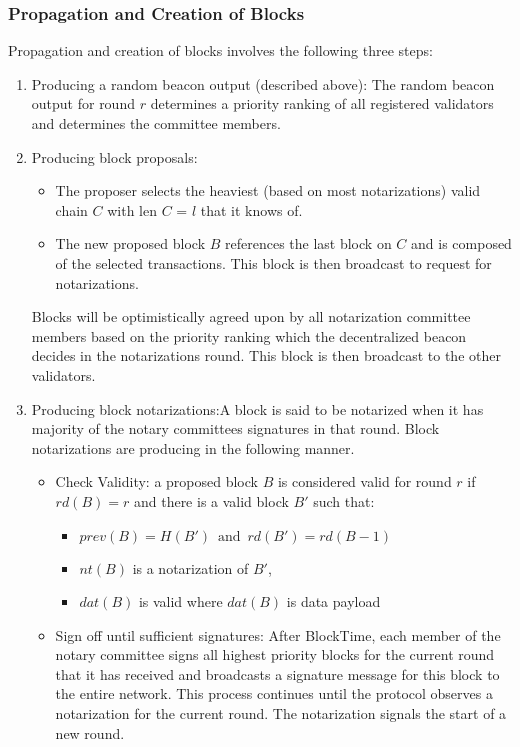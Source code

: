 \documentclass[10pt,journal,compsoc]{IEEEtran}
\begin{document}
\subsubsection{Propagation and Creation of Blocks}
Propagation and creation of blocks involves the following three steps: 
\begin{enumerate}
    \item Producing a random beacon output (described above): The random beacon output for round $r$ determines a priority ranking of all registered validators and determines the committee members.
    \item Producing block proposals:
    \begin{itemize}
        \item The proposer selects the heaviest (based on most notarizations) valid chain $C$ with len $C$ = $l$ that it knows of.
        \item The new proposed block $B$ references the last block on $C$ and is composed of the selected transactions. This block is then broadcast to request for notarizations.
    \end{itemize}
    Blocks will be optimistically agreed upon by all notarization committee members based on the priority ranking which the decentralized beacon decides in the notarizations round. This block is then broadcast to the other validators.
    \item Producing block notarizations:A block is said to be notarized when it has majority of the notary committees signatures in that round. Block notarizations are producing in the following manner.
    \begin{itemize}
        \item Check Validity: a proposed block $B$ is considered valid for round $r$ if $rd(B) = r$ and there is a valid block $B'$ such that:
        \begin{itemize}
            \item $prev(B)=H(B') \, \textrm{ and } \, rd(B') = rd(B-1)$
            \item $nt(B)$ is a notarization of $B'$, 
            \item $dat(B)$ is valid where $dat(B)$ is data payload
        \end{itemize}
        \item Sign off until sufficient signatures: After BlockTime, each member of the notary committee signs all highest priority blocks for the current round that it has received and broadcasts a signature message for this block to the entire network. This process continues until the protocol observes a notarization for the current round. The notarization signals the start of a new round.
    \end{itemize}
\end{enumerate}
\end{document}
